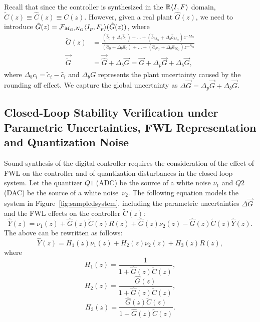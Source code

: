 \documentclass[final]{sig-alternate-05-2015}
\newcommand{\aabatecmt}[1]{}%
\newcommand{\dariocmt}[1]{}%
\begin{document}
Recall that since the controller is synthesized in the $\mathbb{R}\langle{I},{F}\rangle$
domain, $\tilde{C}(z) \equiv \hat{C}(z) \equiv C(z)$. 
However, given a real plant $\hat{G}(z)$, 
we need to introduce $\tilde G(z)=\mathcal{F}_{M_G,N_G}\langle{I_p},{F_p}\rangle(\hat{G}(z))$, where 
%
\begin{align}
\label{digital_plant_tf}
\tilde G(z)&=\frac{(\hat{b}_{0}+\Delta_b \hat{b}_{0}) +...+(\hat{b}_{M_G}+\Delta_b \hat{b}_{M_G})z^{-M_G}}{(\hat{a}_{0}+\Delta_b \hat{a}_{0})+...+(\hat{a}_{N_G}+\Delta_b \hat{a}_{N_G})z^{-N_G}} \nonumber \\
\vec{\tilde G} &=\vec{\hat{G}}+\Delta_b{\vec{G}}=\vec{G}+\Delta_p{\vec{G}}+\Delta_b{\vec{G}}, 
\end{align}
%
where $\Delta_bc_i=\tilde{c}_i-\hat{c}_i$ and $\Delta_b{G}$ represents the
plant uncertainty caused by the rounding off effect.  We capture the global
uncertainty as $\Delta{\vec{G}}=\Delta_p{\vec{G}}+\Delta_b{\vec{G}}$.

\subsection{Closed-Loop Stability Verification under Parametric
Uncertainties, FWL Representation and Quantization Noise}
\label{sec:stability}

\aabatecmt{[Dario: please go through this section again, and clarify what sources of imprecision we consider where, distinguishing between plant and controller. also comment on why we operate on hat G rather than on tilde G - as we discussed yesterday. ]}
\dariocmt{I added a paragraph at the end of the section that should clarify.}
%
Sound synthesis of the digital controller requires the consideration of the
effect of FWL on the controller and of quantization disturbances in the
closed-loop system.  Let the quantizer $Q1$ (ADC) be the source of a white
noise $\nu_{1}$ and $Q2$ (DAC) be the source of a white noise~$\nu_{2}$. 
The following equation models the system in Figure~\ref{fig:sampledsystem},
including the parametric uncertainties $\Delta \vec{G}$ and the FWL
effects on the controller $\tilde{C}(z)$:
%
\begin{equation}
\hat{Y}(z)=\nu_{1}(z)+\hat{G}(z)\tilde{C}(z)R(z)+\hat{G}(z)\nu_{2}(z)-\hat{G}(z)\tilde{C}(z)\hat{Y}(z). 
\end{equation}
%
The above can be rewritten as follows:
%
\begin{equation}
\label{eq:outputfunctions}
\hat{Y}(z)=H_{1}(z)\nu_{1}(z)+H_{2}(z)\nu_{2}(z)+H_{3}(z) R(z),
\end{equation}
%
where
%
\begin{equation*}
H_{1}(z)=\frac{1}{1+\hat{G}(z) \tilde{C}(z)}, 
\end{equation*}
%
\begin{equation*}
H_{2}(z)=\frac{\hat{G}(z)}{1+\hat{G}(z) \tilde{C}(z)}, 
\end{equation*}
%
\begin{equation*}
H_{3}(z)=\frac{\hat{G}(z) \tilde{C}(z)}{1+\hat{G}(z) \tilde{C}(z)}. 
\end{equation*}
\end{document}
